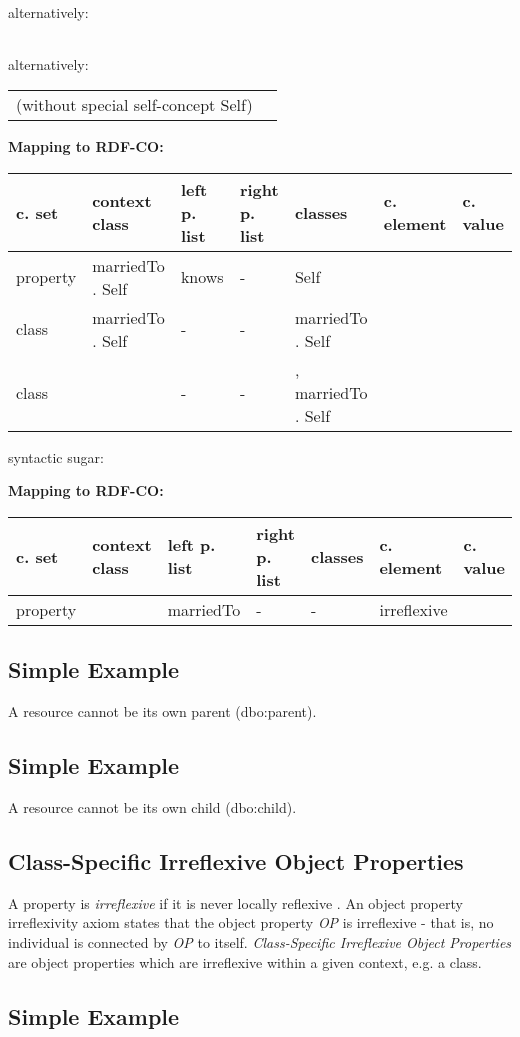 \documentclass{llncs}
\newenvironment{gcotable}{
  \scriptsize
  \sffamily
  \vspace{0cm}
	\begin{center}
	\textbf{\vspace{0.4cm}Mapping to RDF-CO:} \\
  \begin{tabular}{l|l|l|l|l|l|l}
	\hline
  \textbf{c. set} & \textbf{context class} & \textbf{left p. list} & \textbf{right p. list} & \textbf{classes} & \textbf{c. element} & \textbf{c. value} \\
  \hline

}{
  \hline
  \end{tabular}
	\end{center}
}
\newenvironment{DL}{
\vspace{0cm}
	\begin{center}
  \begin{tabular}{r l}

}{
  \end{tabular}
	\end{center}
}
\begin{document}
alternatively:

\begin{DL}
  
\end{DL}

alternatively:

\begin{DL}
 (without special self-concept Self)
\end{DL}

\begin{gcotable}
property &  marriedTo . Self & knows & - & Self &  \\
class &   marriedTo . Self & - & - &  marriedTo . Self &  \\
class &  & - & - & ,   marriedTo . Self &  \\
\end{gcotable}

syntactic sugar:

\begin{gcotable}
property &  & marriedTo & - & - & irreflexive \\
\end{gcotable}

\subsection{Simple Example}

A resource cannot be its own parent (dbo:parent).

\subsection{Simple Example}

A resource cannot be its own child (dbo:child).

\subsection{Class-Specific Irreflexive Object Properties}

A property is \emph{irreflexive} if it is never locally reflexive \cite{Kroetzsch2012}.
An object property irreflexivity axiom states that the object property \emph{OP} is irreflexive - that is, no individual is connected by \emph{OP} to itself.
\emph{Class-Specific Irreflexive Object Properties} are object properties which are irreflexive within a given context, e.g. a class. 

\subsection{Simple Example}
\end{document}
